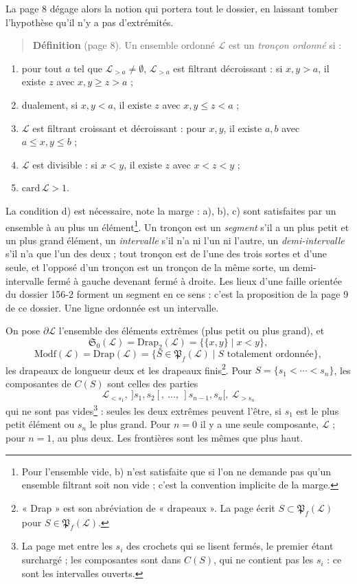 \documentclass[11pt,a4paper]{article}
\begin{document}
La page 8 dégage alors la notion qui portera tout le dossier, en laissant
tomber l'hypothèse qu'il n'y a pas d'extrémités.

\begin{quote}
\textbf{Définition} (page 8). Un ensemble ordonné $\mathcal{L}$ est un
\emph{tronçon ordonné} si :
\end{quote}
\begin{enumerate}
\item[a)] pour tout $a$ tel que $\mathcal{L}_{>a} \neq \emptyset$,
$\mathcal{L}_{>a}$ est filtrant décroissant : si $x, y > a$, il existe $z$ avec
$x, y \geq z > a$ ;
\item[a')] dualement, si $x, y < a$, il existe $z$ avec $x, y \leq z < a$ ;
\item[b)] $\mathcal{L}$ est filtrant croissant et décroissant : pour $x, y$, il
existe $a, b$ avec $a \leq x, y \leq b$ ;
\item[c)] $\mathcal{L}$ est divisible : si $x < y$, il existe $z$ avec $x < z <
y$ ;
\item[d)] $\mathrm{card}\, \mathcal{L} > 1$.
\end{enumerate}

La condition d) est nécessaire, note la marge : a), b), c) sont satisfaites
par un ensemble à au plus un élément\footnote{Pour l'ensemble vide, b) n'est
satisfaite que si l'on ne demande pas qu'un ensemble filtrant soit non vide ;
c'est la convention implicite de la marge.}. Un tronçon est un \emph{segment}
s'il a un plus petit et un plus grand élément, un \emph{intervalle} s'il n'a ni
l'un ni l'autre, un \emph{demi-intervalle} s'il n'a que l'un des deux ; tout
tronçon est de l'une des trois sortes et d'une seule, et l'opposé d'un tronçon
est un tronçon de la même sorte, un demi-intervalle fermé à gauche devenant
fermé à droite. Les lieux d'une faille orientée du dossier 156-2 forment un
segment en ce sens : c'est la proposition de la page 9 de ce dossier. Une ligne
ordonnée est un intervalle.

On pose $\partial \mathcal{L}$ l'ensemble des éléments extrêmes (plus petit ou
plus grand), et
\[
\mathfrak{S}_{0}(\mathcal{L}) = \mathrm{Drap}_{2}(\mathcal{L}) = \{\{x,y\} \mid
x < y\},
\]
\[
\mathrm{Modf}(\mathcal{L}) = \mathrm{Drap}(\mathcal{L}) =
\{S \in \mathfrak{P}_{f}(\mathcal{L}) \mid S \text{ totalement ordonnée}\},
\]
les drapeaux de longueur deux et les drapeaux finis\footnote{« Drap » est son
abréviation de « drapeaux ». La page écrit $S \subset
\mathfrak{P}_{f}(\mathcal{L})$ pour $S \in \mathfrak{P}_{f}(\mathcal{L})$.}. Pour
$S = \{s_{1} < \cdots < s_{n}\}$, les composantes de $C(S)$ sont celles des
parties
\[
\mathcal{L}_{<s_{1}},\ ]s_{1}, s_{2}[,\ \dots,\ ]s_{n-1}, s_{n}[,\
\mathcal{L}_{>s_{n}}
\]
qui ne sont pas vides\footnote{La page met entre les $s_{i}$ des crochets qui se
lisent fermés, le premier étant surchargé ; les composantes sont dans $C(S)$,
qui ne contient pas les $s_{i}$ : ce sont les intervalles ouverts.} : seules
les deux extrêmes peuvent l'être, si $s_{1}$ est le plus petit élément ou
$s_{n}$ le plus grand. Pour $n = 0$ il y a une seule composante, $\mathcal{L}$ ;
pour $n = 1$, au plus deux. Les frontières sont les mêmes que plus haut.
\end{document}
